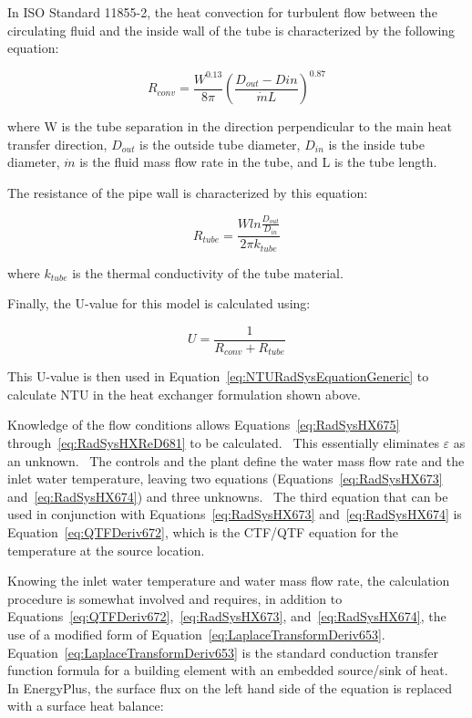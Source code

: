 {In ISO Standard 11855-2, the heat convection for turbulent flow between the circulating fluid and the inside wall of the tube is characterized by the following equation:

\begin{equation}
{R_{conv}} = \frac{W^{0.13}}{8 \pi} {\left(\frac{D_{out}-D{in}}{\dot m L}\right)}^{0.87}
\end{equation}

where W is the tube separation in the direction perpendicular to the main heat transfer direction, \({D_{out}}\) is the outside tube diameter,  \({D_{in}}\) is the inside tube diameter,  \(\dot m\) is the fluid mass flow rate in the tube, and L is the tube length.

The resistance of the pipe wall is characterized by this equation:

\begin{equation}
{R_{tube}} = \frac{W ln\frac{D_{out}}{D_{in}}}{2 \pi k_{tube}}
\end{equation}

where \(k_{tube}\) is the thermal conductivity of the tube material.

Finally, the U-value for this model is calculated using:

\begin{equation}
U = \frac{1}{{R_{conv}} + {R_{tube}}}
\end{equation}

This U-value is then used in Equation~\ref{eq:NTURadSysEquationGeneric} to calculate NTU in the heat exchanger formulation shown above.

Knowledge of the flow conditions allows Equations~\ref{eq:RadSysHX675} through~\ref{eq:RadSysHXReD681} to be calculated.~ This essentially eliminates \(\varepsilon\) as an unknown.~ The controls and the plant define the water mass flow rate and the inlet water temperature, leaving two equations (Equations~\ref{eq:RadSysHX673} and~\ref{eq:RadSysHX674}) and three unknowns.~ The third equation that can be used in conjunction with Equations~\ref{eq:RadSysHX673} and~\ref{eq:RadSysHX674} is Equation~\ref{eq:QTFDeriv672}, which is the CTF/QTF equation for the temperature at the source location.

Knowing the inlet water temperature and water mass flow rate, the calculation procedure is somewhat involved and requires, in addition to Equations~\ref{eq:QTFDeriv672},~\ref{eq:RadSysHX673}, and~\ref{eq:RadSysHX674}, the use of a modified form of Equation~\ref{eq:LaplaceTransformDeriv653}.~ Equation~\ref{eq:LaplaceTransformDeriv653} is the standard conduction transfer function formula for a building element with an embedded source/sink of heat.~ In EnergyPlus, the surface flux on the left hand side of the equation is replaced with a surface heat balance:

}
